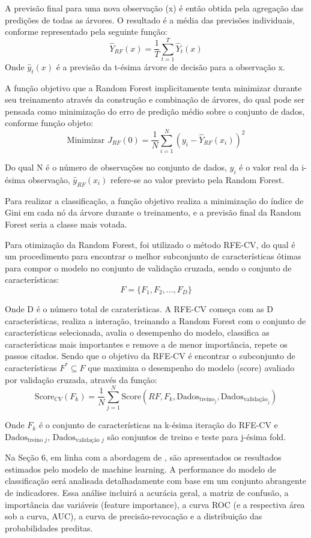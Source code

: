 A previsão final para uma nova observação (x) é então obtida pela agregação das predições de todas as árvores. O resultado é a média das previsões individuais, conforme representado pela seguinte função:
$$ \hat{Y}_{RF}(x) = \frac{1}{T}\sum_{t=1}^{T}\hat{Y}_{t}(x) $$
Onde $\hat{y}_{t}(x)$ é a previsão da t-ésima árvore de decisão para a observação x.

A função objetivo que a Random Forest implicitamente tenta minimizar durante seu treinamento através da construção e combinação de árvores, do qual pode ser pensada como minimização do erro de predição médio sobre o conjunto de dados, conforme função objeto:
$$ \text{Minimizar } J_{RF}(0) = \frac{1}{N} \sum_{i=1}^{N} (y_i - \hat{Y}_{RF}(x_i))^2 $$

Do qual N é o número de observações no conjunto de dados, $y_{i}$ é o valor real da i-ésima observação, $\hat{y}_{RF}(x_{i})$ refere-se ao valor previsto pela Random Forest.

Para realizar a classificação, a função objetivo realiza a minimização do índice de Gini em cada nó da árvore durante o treinamento, e a previsão final da Random Forest seria a classe mais votada.

Para otimização da Random Forest, foi utilizado o método RFE-CV, do qual é um procedimento para encontrar o melhor subconjunto de características ótimas para compor o modelo no conjunto de validação cruzada, sendo o conjunto de características:
$$ F=\{F_{1},F_{2},...,F_{D}\} $$

Onde D é o número total de caraterísticas. A RFE-CV começa com as D características, realiza a interação, treinando a Random Forest com o conjunto de características selecionada, avalia o desempenho do modelo, classifica as características mais importantes e remove a de menor importância, repete os passos citados. Sendo que o objetivo da RFE-CV é encontrar o subconjunto de características $F^{*}\subseteq F$ que maximiza o desempenho do modelo (score) avaliado por validação cruzada, através da função:
$$ \text{Score}_{CV}(F_k) = \frac{1}{N} \sum_{j=1}^{N} \text{Score}(RF, F_k, \text{Dados}_{\text{treino}_j}, \text{Dados}_{\text{validação}_j}) $$

Onde $F_{k}$ é o conjunto de características na k-ésima iteração do RFE-CV e $\text{Dados}_{\text{treino } j}$, $\text{Dados}_{\text{validação } j}$ são conjuntos de treino e teste para j-ésima fold.

Na Seção 6, em linha com a abordagem de , são apresentados os resultados estimados pelo modelo de machine learning. A performance do modelo de classificação será analisada detalhadamente com base em um conjunto abrangente de indicadores. Essa análise incluirá a acurácia geral, a matriz de confusão, a importância das variáveis (feature importance), a curva ROC (e a respectiva área sob a curva, AUC), a curva de precisão-revocação e a distribuição das probabilidades preditas.


